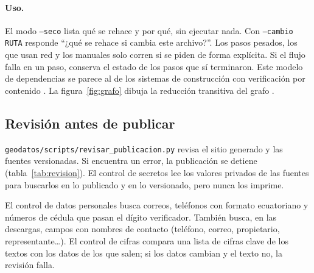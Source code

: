\documentclass{sosg-informe}
\begin{document}
\paragraph{Uso.} El modo \texttt{--seco} lista qué se rehace y por qué, sin ejecutar nada. Con \texttt{--cambio RUTA} responde \enquote{¿qué se rehace si cambia este archivo?}. Los pasos pesados, los que usan red y los manuales solo corren si se piden de forma explícita. Si el flujo falla en un paso, conserva el estado de los pasos que sí terminaron. Este modelo de dependencias se parece al de los sistemas de construcción con verificación por contenido \citep{mokhov2018}. La figura~\ref{fig:grafo} dibuja la reducción transitiva del grafo \citep{aho1972}.

\subsection{Revisión antes de publicar}
\texttt{geodatos/scripts/revisar\_publicacion.py} revisa el sitio generado y las fuentes versionadas. Si encuentra un error, la publicación se detiene (tabla~\ref{tab:revision}). El control de secretos lee los valores privados de las fuentes para buscarlos en lo publicado y en lo versionado, pero nunca los imprime.

El control de datos personales busca correos, teléfonos con formato ecuatoriano y números de cédula que pasan el dígito verificador. También busca, en las descargas, campos con nombres de contacto (teléfono, correo, propietario, representante\ldots). El control de cifras compara una lista de cifras clave de los textos con los datos de los que salen; si los datos cambian y el texto no, la revisión falla.
\end{document}
